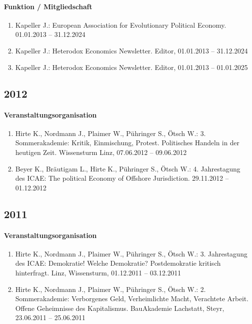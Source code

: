 \paragraph{Funktion / Mitgliedschaft}
\begin{enumerate}[leftmargin=*, labelsep=0.5cm]
\item Kapeller J.: European Association for Evolutionary Political Economy. 01.01.2013 -- 31.12.2024
\item Kapeller J.: Heterodox Economics Newsletter. Editor, 01.01.2013 -- 31.12.2024
\item Kapeller J.: Heterodox Economics Newsletter. Editor, 01.01.2013 -- 01.01.2025
\end{enumerate}
\subsection*{2012}
\paragraph{Veranstaltungsorganisation}
\begin{enumerate}[leftmargin=*, labelsep=0.5cm]
\item Hirte K., Nordmann J., Plaimer W., Pühringer S., Ötsch W.: 3. Sommerakademie: Kritik, Einmischung, Protest. Politisches Handeln in der heutigen Zeit. Wissensturm Linz, 07.06.2012 -- 09.06.2012
\item Beyer K., Bräutigam L., Hirte K., Pühringer S., Ötsch W.: 4. Jahrestagung des ICAE: The political Economy of Offshore Jurisdiction. 29.11.2012 -- 01.12.2012
\end{enumerate}
\subsection*{2011}
\paragraph{Veranstaltungsorganisation}
\begin{enumerate}[leftmargin=*, labelsep=0.5cm]
\item Hirte K., Nordmann J., Plaimer W., Pühringer S., Ötsch W.: 3. Jahrestagung des ICAE: Demokratie! Welche Demokratie? Postdemokratie kritisch hinterfragt. Linz, Wissensturm, 01.12.2011 -- 03.12.2011
\item Hirte K., Nordmann J., Plaimer W., Pühringer S., Ötsch W.: 2. Sommerakademie: Verborgenes Geld, Verheimlichte Macht, Verachtete Arbeit. Offene Geheimnisse des Kapitalismus. BauAkademie Lachstatt, Steyr, 23.06.2011 -- 25.06.2011
\end{enumerate}
